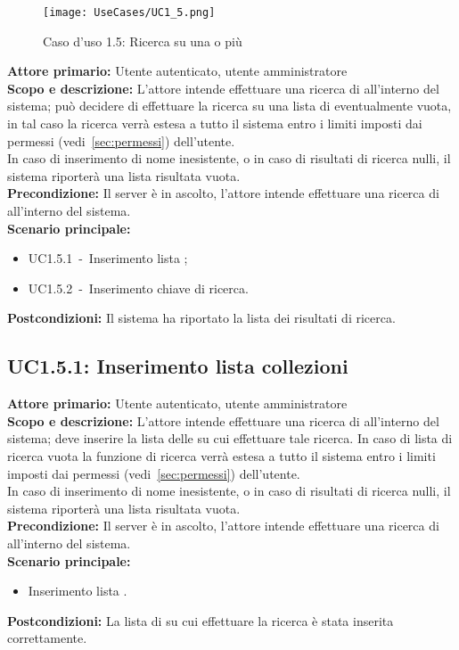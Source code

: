 \documentclass{scalatekids-article}
\begin{document}
\begin{figure}[H]
  \begin{center}
    \texttt{[image: UseCases/UC1\_5.png]}
    \caption{Caso d'uso 1.5: Ricerca su una o più }
  \end{center}
\end{figure}
\textbf{Attore primario:} Utente autenticato, utente amministratore\\
\textbf{Scopo e descrizione:} L'attore intende effettuare una ricerca di  all'interno del sistema; può decidere di effettuare la ricerca su una lista di  eventualmente vuota, in tal caso la
ricerca verrà estesa a tutto il sistema entro i limiti imposti dai permessi (vedi~\ref{sec:permessi}) dell'utente.\\
In caso di inserimento di nome  inesistente, o in caso di risultati di ricerca nulli, il sistema riporterà una lista risultata vuota.\\ %
\textbf{Precondizione:} Il server è in ascolto, l'attore intende effettuare una ricerca di  all'interno del sistema.\\
\textbf{Scenario principale:}
\begin{itemize}
\item UC1.5.1\ -\ Inserimento lista ;
\item UC1.5.2\ -\ Inserimento chiave di ricerca.
\end{itemize}
\textbf{Postcondizioni:} Il sistema ha riportato la lista dei risultati di ricerca.

\subsection{UC1.5.1: Inserimento lista collezioni}

\textbf{Attore primario:} Utente autenticato, utente amministratore\\
\textbf{Scopo e descrizione:} L'attore intende effettuare una ricerca di  all'interno del sistema; deve inserire la lista delle  su cui effettuare tale ricerca. In caso di lista di ricerca vuota
la funzione di ricerca verrà estesa a tutto il sistema entro i limiti imposti dai permessi (vedi~\ref{sec:permessi}) dell'utente.\\
In caso di inserimento di nome  inesistente, o in caso di risultati di ricerca nulli, il sistema riporterà una lista risultata vuota.\\ %
\textbf{Precondizione:} Il server è in ascolto, l'attore intende effettuare una ricerca di  all'interno del  sistema.\\
\textbf{Scenario principale:}
\begin{itemize}
\item Inserimento lista .
\end{itemize}
\textbf{Postcondizioni:} La lista di  su cui effettuare la ricerca è stata inserita correttamente.
\end{document}
